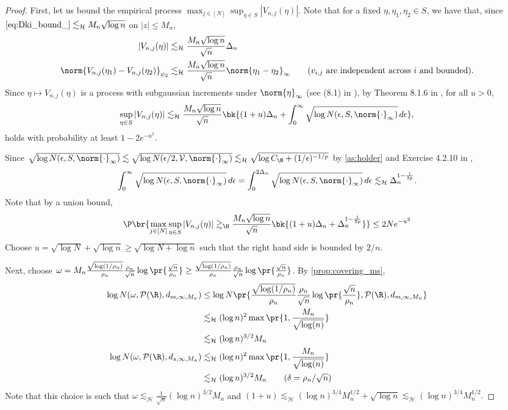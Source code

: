 \documentclass[12pt, reqno]{amsart}
\newcommand{\absauto}[1]{\left| #1 \right|}
\newcommand{\leH}{\lesssim_{\mathcal{H}}}
\numberwithin{equation}{section}
\begin{document}
\begin{refsection}
\begin{appendices}
\begin{proof}
First, let us bound the empirical process $\max_{j\in[N]} \sup_{\eta\in S} |V_{n,j}
(\eta)|$. Note that for a fixed $\eta, \eta_1, \eta_2 \in S$, we have that, since $
\eqref{eq:Dki_bound_} \leH M_n \sqrt{\log n}$ on $|z| \le M_n$, \begin{align*}
\absauto{V_{n,j}(\eta)} &\leH \frac{ M_n \sqrt{\log n}}{\sqrt{n}} \Delta_n \\
\norm{V_{n,j}(\eta_1) - V_{n,j}(\eta_2)}_{\psi_2} &\leH \frac{ M_n \sqrt{\log n}}{\sqrt{n}}
\norm{\eta_1 - \eta_2}_\infty \tag{$v_{i,j}$ are independent across $i$ and bounded}.
\end{align*}
Since $\eta \mapsto V_{n, j}
(\eta)$ is a process with subgaussian increments under $\norm{\eta}_\infty$ (see (8.1)
in \citet{vershynin2018high}), by Theorem 8.1.6 in
\citet{vershynin2018high}, for all $u > 0$, \[
\sup_{\eta \in S} |V_{n,j}(\eta)| \leH \frac{ M_n \sqrt{\log n}}{
\sqrt{n}} \bk{(1+u)\Delta_n + 
\int_0^{\infty} \sqrt{\log N(\epsilon, S, \norm{\cdot}_\infty) } \,d \epsilon
},
\]
holds with probability at least $1-2e^{-u^2}$.


Since $
\sqrt{\log N(\epsilon, S, \norm{\cdot}_\infty) } \lesssim \sqrt{\log N(\epsilon/2,
\mathcal V,
\norm{\cdot}_\infty)} \leH \sqrt{\log C_\H + (1/\epsilon)^{-1/p}}$ by 
\cref{as:holder} and Exercise 4.2.10 in \citet{vershynin2018high}, \[
\int_0^{\infty} \sqrt{\log N(\epsilon, S, \norm{\cdot}_\infty) } \,d \epsilon = \int_0^{2
\Delta_n} \sqrt{\log N
(\epsilon, S, \norm{\cdot}_\infty) } \,d \epsilon \leH
\Delta_n^{1-\frac{1}{2p}}.
\]
Note that by a union bound, \begin{align*}
\P\br{
  \max_{j \in [N]} \sup_{\eta \in S} 
 |V_{n,j}(\eta)| \gtrsim_\H \frac{ M_n \sqrt{\log n}}{
\sqrt{n}} \bk{(1+u)\Delta_n + \Delta_n^{1-\frac{1}{2p}}
}
} \le 2N e^{-u^2}
\end{align*}
Choose $u = \sqrt{\log N} + \sqrt{\log n} \ge \sqrt{\log N + \log n}$ such that the right
hand side is bounded by $2/n$.


Next, choose $\omega = M_n \frac{\sqrt{\log(1/\rho_n)}}{\rho_n} \frac{\rho_n}{\sqrt{n}}
\log \pr{\frac{\sqrt{n}
}{\rho_n}} \ge \frac{\sqrt{\log(1/\rho_n)}}{\rho_n} \frac{\rho_n}{\sqrt{n}}
\log \pr{\frac{\sqrt{n}
}{\rho_n}}$. By \cref{prop:covering_ms}, \begin{align*}
\log N(\omega, \mathcal P(\R), d_{m, \infty, M_n}) 
&\le \log N\pr{
  \frac{\sqrt{\log(1/\rho_n)}}{\rho_n} \frac{\rho_n}{\sqrt{n}}
\log \pr{\frac{\sqrt{n}
}{\rho_n}} , \mathcal P(\R), d_{m,\infty, M_n}
} \\
&\leH (\log n)^2 \max\pr{1, \frac{M_n}{\sqrt{\log(n)}}} \\
&\leH (\log n)^{3/2} M_n
\\ 
\log N(\omega, \mathcal P(\R), d_{s, \infty, M_n}) &\leH (\log n)^2 \max\pr{1, \frac{M_n}{
\sqrt{\log(n)}}} \\
&\leH (\log n)^{3/2} M_n  \tag{$\delta = \rho_n/\sqrt{n}$}
\end{align*}
Note that this choice is such that  $\omega \leH \frac{1}{\sqrt{n}}(\log n)^{3/2} M_n$ and
$
(1+u) \leH (\log n)^{3/4} M_n^{1/2} + \sqrt{\log n} \leH (\log n)^{3/4} M_n^{1/2}. 
$


\end{proof}
\end{appendices}
\end{refsection}
\end{document}
